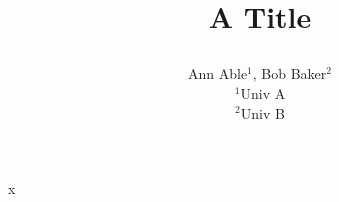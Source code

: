 \documentclass{article}
\begin{document}
\title{A Title\\
\author{Ann Able$^1$, Bob Baker$^2$\\ $^1$Univ A\\ $^2$Univ B}}
\maketitle
x
\end{document}
